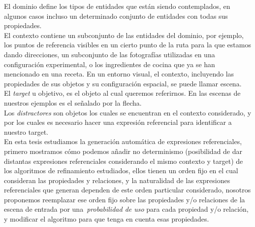 



El dominio define los tipos de entidades que est\'an siendo contemplados, en algunos
casos incluso un determinado conjunto de entidades con todas sus propiedades.\\

El contexto contiene un subconjunto de las entidades del dominio, por ejemplo, los puntos de referencia visibles en un cierto punto de la ruta para la que estamos dando direcciones, un
subconjunto de las fotograf\'ias utilizadas en una configuraci\'on experimental, o los ingredientes de cocina que ya se han mencionado en una receta. En un entorno visual, el contexto, incluyendo las
propiedades de sus objetos y su configuraci\'on espacial, se puede llamar escena. \\

El \emph{target} u objetivo, es el objeto al cual queremos referirnos. En las escenas de nuestros ejemplos es el se\~nalado por la flecha.\\

Los \emph{distractores} son objetos los cuales se encuentran en el contexto considerado, y por los cuales es necesario hacer una expresi\'on referencial para identificar a nuestro target. \\

En esta tesis estudiamos la generaci\'on autom\'atica de expresiones referenciales, 
primero mostramos c\'omo podemos a\~nadir no determinismo (posibilidad de dar distantas expresiones referenciales considerando el mismo contexto y target) de los algoritmos de refinamiento estudiados, ellos tienen un orden fijo en el cual consideran las propiedades y relaciones, y la naturalidad de las expresiones referenciales que generan dependen de este orden particular considerado, nosotros proponemos reemplazar ese orden fijo
sobre las propiedades y/o relaciones de la escena de entrada por una~\emph{probabilidad de uso} para cada propiedad y/o relaci\'on, y modificar el algoritmo para que tenga en cuenta esas propiedades.\\


